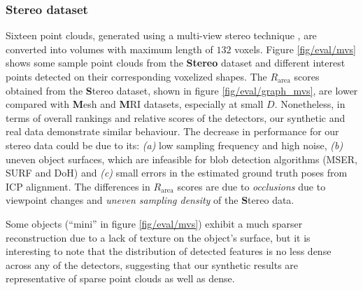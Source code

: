 \subsubsection{Stereo dataset} 
Sixteen point clouds,
generated using a multi-view stereo technique \cite{Vogiatzis2011},
are converted into volumes with maximum length of $132$ voxels. Figure \ref{fig/eval/mvs} shows some sample point clouds from the \textbf{Stereo} dataset and different interest points detected on their corresponding voxelized shapes.
The $R_{\textrm{area}}$ scores obtained from the {\textbf Stereo} dataset, shown in figure \ref{fig/eval/graph_mvs}, are lower compared with {\textbf Mesh} and {\textbf MRI} datasets, especially at small $D$. Nonetheless, in terms of overall rankings and relative scores of the detectors, our synthetic and real data demonstrate similar behaviour. The decrease in performance for our stereo data could be due to its: \emph{(a)} low sampling frequency and high noise, \emph{(b)} uneven object surfaces, which are infeasible for blob detection algorithms (\eg MSER, SURF and DoH) and \emph{(c)} small errors in the estimated ground truth poses from ICP alignment.
The differences in $R_{\textrm{area}}$ scores are due to \emph{occlusions} due to viewpoint changes and \emph{uneven sampling density} of the {\textbf Stereo} data. 
 
Some objects (\eg ``mini'' in figure \ref{fig/eval/mvs}) exhibit a much sparser reconstruction due to a lack of texture on the object's surface, but it is interesting to note that the distribution of detected features is no less dense across any of the detectors, suggesting that our synthetic results are representative of sparse point clouds as well as dense.

